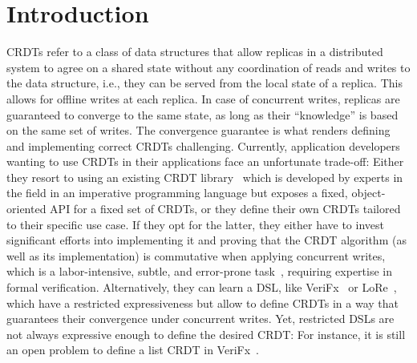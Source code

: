 
\chapter{Introduction}\label{ch:intro}

\acp{CRDT} refer to a class of data structures that allow replicas in a distributed
system to agree on a shared state without any coordination of reads and writes
to the data structure, i.e., they can be served from the local state of a replica.
This allows for offline writes at each replica.
In case of concurrent writes, replicas are guaranteed to converge to the same state,
as long as their ``knowledge'' is based on the same set of writes.
The convergence guarantee is what renders defining and implementing
correct \acp{CRDT} challenging.
Currently, application developers wanting to use \acp{CRDT} in their applications
face an unfortunate trade-off:
Either they resort to using an existing \ac{CRDT} library~\cite{automerge,yjs,lore}
which is developed by experts in the field in an imperative programming language
but exposes a fixed, object-oriented \acs{API} for a fixed set of \acp{CRDT},
or they define their own \acp{CRDT} tailored to their specific use case.
If they opt for the latter, they either have to invest significant efforts
into implementing it and proving that the \ac{CRDT} algorithm
(as well as its implementation) is commutative when applying concurrent writes,
which is a labor-intensive, subtle, and error-prone
task~\cite{gomes2017verifying,kleppmann2022assessing},
requiring expertise in formal verification.
Alternatively, they can learn a \ac{DSL}, like VeriFx~\cite{verifx}
or LoRe~\cite{lore}, which have a restricted expressiveness but allow to define
\acp{CRDT} in a way that guarantees their convergence under concurrent writes.
Yet, restricted \acp{DSL} are not always expressive enough
to define the desired \ac{CRDT}:
For instance, it is still an open problem to define a list \ac{CRDT} in
VeriFx~\cite{TODO}.

